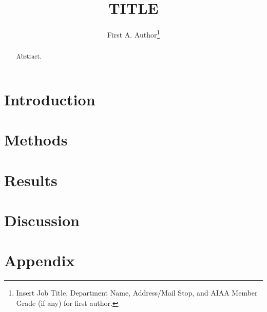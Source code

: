 \documentclass[journal]{new-aiaa}
\title{TITLE}
\author{First A. Author\footnote{Insert Job Title, Department Name, Address/Mail Stop, and AIAA Member Grade (if any) for first author.}}
\affil{Business or Academic Affiliation 1, City, State, Zip Code}
\begin{document}
\maketitle

\begin{abstract}
Abstract.
\end{abstract}


\section{Introduction}


\section{Methods}


\section{Results}


\section{Discussion}


\section*{Appendix}
\end{document}
